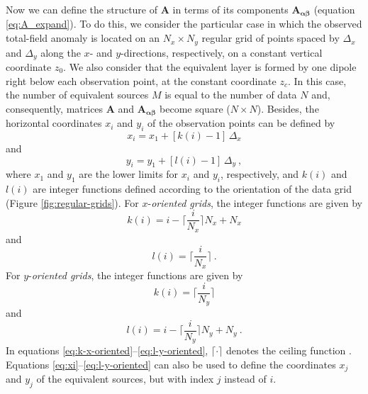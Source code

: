 \documentclass[manuscript]{geophysics}
\begin{document}
	Now we can define the structure of $\mathbf{A}$ in terms of its components 
	$\mathbf{A_{\boldsymbol{\alpha\beta}}}$ (equation \ref{eq:A_expand}). To do this, 
	we consider the particular case in which the observed total-field anomaly is located 
	on an $N_{x} \times N_{y}$ 
	regular grid of points spaced by $\Delta_{x}$ and $\Delta_{y}$ along the $x$- and $y$-directions,
	respectively, on a constant vertical coordinate $z_{0}$. We also consider that the equivalent layer
	is formed by one dipole right below each observation point, at the constant coordinate $z_{c}$.
	In this case, the number of equivalent sources $M$ is equal to the number of data $N$ and, 
	consequently, matrices $\mathbf{A}$ and $\mathbf{A_{\boldsymbol{\alpha\beta}}}$ become 
	square ($N \times N$). 
	Besides, the horizontal coordinates $x_{i}$ and $y_{i}$ of the observation points 
	can be defined by
	\begin{equation}
		x_{i} = x_{1} + \left[ k(i) - 1 \right] \, \Delta_{x}
		\label{eq:xi}
	\end{equation}
	and
	\begin{equation}
		y_{i} = y_{1} + \left[ l(i) - 1 \right] \, \Delta_{y} \: ,
		\label{eq:yi}
	\end{equation}
	where $x_{1}$ and $y_{1}$ are the lower limits for $x_{i}$ and $y_{i}$, respectively,
	and $k(i)$ and $l(i)$ are integer functions defined according to the orientation
	of the data grid (Figure \ref{fig:regular-grids}). 
	For $x$-\textit{oriented grids}, the integer functions are given by
	\begin{equation}
		k(i)  = i - \Bigg\lceil \frac{i}{N_{x}} \Bigg\rceil N_{x} + N_{x}
		\label{eq:k-x-oriented}
	\end{equation}
	and
	\begin{equation}
		l(i) = \Bigg\lceil \frac{i}{N_{x}} \Bigg\rceil \: .
		\label{eq:l-x-oriented}
	\end{equation}
	For $y$-\textit{oriented grids}, the integer functions are given by
	\begin{equation}
		k(i) = \Bigg\lceil \frac{i}{N_{y}} \Bigg\rceil
		\label{eq:k-y-oriented}
	\end{equation}
	and
	\begin{equation}
		l(i) = i - \Bigg\lceil \frac{i}{N_{y}} \Bigg\rceil N_{y} + N_{y} \: .
		\label{eq:l-y-oriented}
	\end{equation}
	In equations \ref{eq:k-x-oriented}--\ref{eq:l-y-oriented}, $\lceil \cdot \rceil$ denotes the ceiling 
	function \citep[e.g.,][ p. 67-68]{graham-etal1994}.
	Equations \ref{eq:xi}--\ref{eq:l-y-oriented} can also be used to define the coordinates 
	$x_{j}$ and $y_{j}$ of the equivalent sources, but with index $j$ instead of $i$.
	
\end{document}
